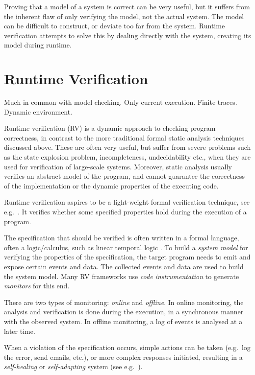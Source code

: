 \documentclass[a4paper,11pt]{kth-mag}
\begin{document}
Proving that a model of a system is correct can be very useful, but it suffers
from the inherent flaw of only verifying the model, not the actual system. The
model can be difficult to construct, or deviate too far from the system.
Runtime verification attempts to solve this by dealing directly with the
system, creating its model during runtime.


\section{Runtime Verification} \label{section-rv}

Much in common with model checking. Only current execution. Finite traces.
Dynamic environment.

Runtime verification (RV) is a dynamic approach to checking program
correctness, in contrast to the more traditional formal static analysis
techniques discussed above. These are often very useful, but suffer from severe
problems such as the state explosion problem, incompleteness, undecidability
etc., when they are used for verification of large-scale systems.  Moreover,
static analysis usually verifies an abstract model of the program, and cannot
guarantee the correctness of the implementation or the dynamic properties of
the executing code.

Runtime verification aspires to be a light-weight formal verification
technique, see e.g.\ \cite{leucker09abriefaccount,delgado04taxonomy}. It
verifies whether some specified properties hold during the execution of a
program.

The specification that should be verified is often written in a formal
language, often a logic/calculus, such as linear temporal logic
\cite{pnueli77}. To build a \emph{system model} for verifying the properties of
the specification, the target program needs to emit and expose certain events
and data. The collected events and data are used to build the system model.
Many RV frameworks use \textit{code instrumentation} to generate
\textit{monitors} for this end.

There are two types of monitoring: \emph{online} and \emph{offline}. In online
monitoring, the analysis and verification is done during the execution, in a
synchronous manner with the observed system. In offline monitoring, a log of
events is analysed at a later time.

When a violation of the specification occurs, simple actions can be taken
(e.g.\ log the error, send emails, etc.), or more complex responses initiated,
resulting in a \textit{self-healing} or \textit{self-adapting} system (see
e.g.\ \cite{huebscher08survey}).
\end{document}
